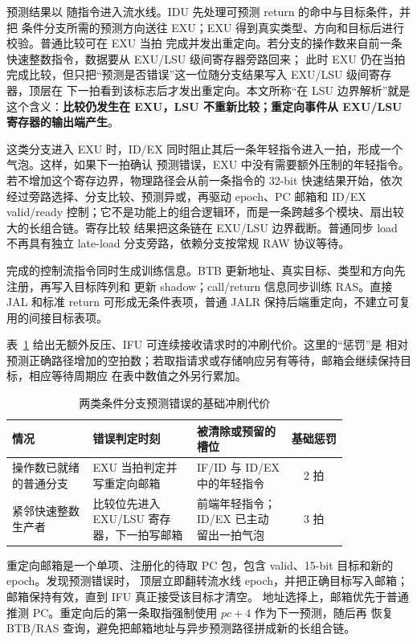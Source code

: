 预测结果以  随指令进入流水线。IDU 先处理可预测 return 的命中与目标条件，并把
条件分支所需的预测方向送往 EXU；EXU 得到真实类型、方向和目标后进行校验。普通比较可在 EXU 当拍
完成并发出重定向。若分支的操作数来自前一条快速整数指令，数据要从 EXU/LSU 级间寄存器旁路回来；
此时 EXU 仍在当拍完成比较，但只把“预测是否错误”这一位随分支结果写入 EXU/LSU 级间寄存器，顶层在
下一拍看到该标志后才发出重定向。本文所称“在 LSU 边界解析”就是这个含义：\textbf{比较仍发生在
EXU，LSU 不重新比较；重定向事件从 EXU/LSU 寄存器的输出端产生}。

这类分支进入 EXU 时，ID/EX 同时阻止其后一条年轻指令进入一拍，形成一个气泡。这样，如果下一拍确认
预测错误，EXU 中没有需要额外压制的年轻指令。若不增加这个寄存边界，物理路径会从前一条指令的
32-bit 快速结果开始，依次经过旁路选择、分支比较、预测异或，再驱动 epoch、PC 邮箱和 ID/EX
valid/ready 控制；它不是功能上的组合逻辑环，而是一条跨越多个模块、扇出较大的长组合链。寄存比较
结果把这条链在 EXU/LSU 边界截断。普通同步 load 不再具有独立 late-load 分支旁路，依赖分支按常规
RAW 协议等待。

完成的控制流指令同时生成训练信息。BTB 更新地址、真实目标、类型和方向先注册，再写入目标阵列和
更新 shadow；call/return 信息同步训练 RAS。直接 JAL 和标准 return 可形成无条件表项，普通 JALR
保持后端重定向，不建立可复用的间接目标表项。



表~\ref{tab:branch-flush-penalty} 给出无额外反压、IFU 可连续接收请求时的冲刷代价。这里的“惩罚”是
相对预测正确路径增加的空拍数；若取指请求或存储响应另有等待，邮箱会继续保持目标，相应等待周期应
在表中数值之外另行累加。

\begin{table}[H]\centering\small
\caption{两类条件分支预测错误的基础冲刷代价}\label{tab:branch-flush-penalty}
\setlength{\tabcolsep}{5pt}
\begin{tabular}{@{}p{0.24\linewidth}p{0.31\linewidth}p{0.28\linewidth}c@{}}
\toprule
\textbf{情况}&\textbf{错误判定时刻}&\textbf{被清除或预留的槽位}&\textbf{基础惩罚}\\\midrule
操作数已就绪的普通分支&EXU 当拍判定并写重定向邮箱&IF/ID 与 ID/EX 中的年轻指令&2 拍\\
紧邻快速整数生产者&比较位先进入 EXU/LSU 寄存器，下一拍写邮箱&前端年轻指令；ID/EX 已主动留出一拍气泡&3 拍\\
\bottomrule
\end{tabular}
\end{table}

重定向邮箱是一个单项、注册化的待取 PC 包，包含 valid、15-bit 目标和新的 epoch。发现预测错误时，
顶层立即翻转流水线 epoch，并把正确目标写入邮箱；邮箱保持有效，直到 IFU 真正接受该目标才清空。
地址选择上，邮箱优先于普通推测 PC。重定向后的第一条取指强制使用 $pc+4$ 作为下一预测，随后再
恢复 BTB/RAS 查询，避免把邮箱地址与异步预测路径拼成新的长组合链。

